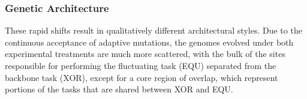 \subsubsection{Genetic Architecture}

These rapid shifts result in qualitatively different architectural styles. Due to the continuous acceptance of adaptive mutations, the genomes evolved under both experimental treatments are much more scattered, with the bulk of the sites responsible for performing the fluctuating task (EQU) separated from the backbone task (XOR), except for a core region of overlap, which represent portions of the tasks that are shared between XOR and EQU.

